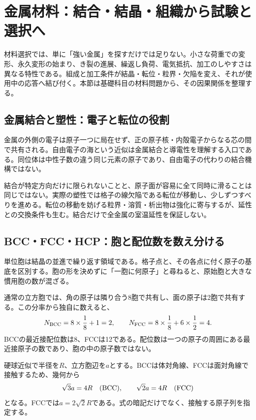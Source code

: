 \section{金属材料：結合・結晶・組織から試験と選択へ}
\label{theory:material:overview}
材料選択では、単に「強い金属」を探すだけでは足りない。小さな荷重での変形、永久変形の始まり、き裂の進展、繰返し負荷、電気抵抗、加工のしやすさは異なる特性である。組成と加工条件が結晶・転位・粒界・欠陥を変え、それが使用中の応答へ結び付く。本節は基礎科目の材料問題から、その因果関係を整理する。

\subsection{金属結合と塑性：電子と転位の役割}
\label{theory:material:bonding}
金属の外側の電子は原子一つに局在せず、正の原子核・内殻電子からなる芯の間で共有される。自由電子の海という近似は金属結合と導電性を理解する入口である\cite{mit_material_atomistic2001}。同位体は中性子数の違う同じ元素の原子であり、自由電子の代わりの結合機構ではない。

結合が特定方向だけに限られないことと、原子面が容易に全て同時に滑ることは同じではない。実際の塑性では格子の線欠陥である転位が移動し、少しずつすべりを進める。転位の移動を妨げる粒界・溶質・析出物は強化に寄与するが、延性との交換条件も生む\cite{mit_material_dislocations2001}。結合だけで全金属の室温延性を保証しない。

\subsection{BCC・FCC・HCP：胞と配位数を数え分ける}
\label{theory:material:crystals}
単位胞は結晶の並進で繰り返す領域である。格子点と、その各点に付く原子の基底を区別する。胞の形を決めずに「一胞に何原子」と尋ねると、原始胞と大きな慣用胞の数が混ざる\cite{cambridge_unitcell,princeton_hcp}。

通常の立方胞では、角の原子は隣り合う8胞で共有し、面の原子は2胞で共有する。この分率から独自に数えると、
\[
 N_{\rm BCC}=8\times\frac18+1=2,\qquad
 N_{\rm FCC}=8\times\frac18+6\times\frac12=4.
\]
BCCの最近接配位数は8、FCCは12である。配位数は一つの原子の周囲にある最近接原子の数であり、胞の中の原子数ではない\cite{openstax_crystals}。

硬球近似で半径を\(R\)、立方胞辺を\(a\)とする。BCCは体対角線、FCCは面対角線で接触するため、幾何から
\[
 \sqrt3a=4R\quad({\rm BCC}),\qquad
 \sqrt2a=4R\quad({\rm FCC})
\]
となる。FCCでは\(a=2\sqrt2R\)である。式の暗記だけでなく、接触する原子列を指定する。

